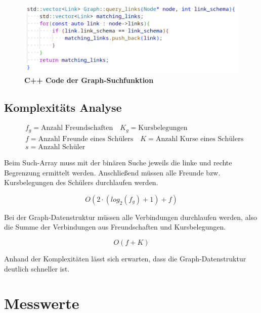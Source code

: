 \documentclass[11pt,a4paper]{article}
\begin{document}
\vspace*{0.5cm}

\begin{figure}[H]
    \centering
    \includegraphics[width=1.0\textwidth]{./res/code_graphdb.png}
    \caption{\textbf{C++ Code der Graph-Suchfunktion}}
\end{figure}

\subsection{Komplexitäts Analyse}

\begin{align*}
    & f_g = \text{Anzahl Freundschaften} \quad
    K_g = \text{Kursbelegungen} \\ 
    & f = \text{Anzahl Freunde eines Schülers} \quad
    K = \text{Anzahl Kurse eines Schülers} \\
    & s = \text{Anzahl Schüler} \quad
\end{align*}

Beim Such-Array muss mit der binären Suche jeweils die linke und rechte Begrenzung
ermittelt werden. Anschließend müssen alle Freunde bzw. Kursbelegungen des
Schülers durchlaufen werden.

\begin{equation*}
    O(2 \cdot ( log_2(f_g) + 1 ) + f)
\end{equation*}

Bei der Graph-Datenstruktur müssen alle Verbindungen durchlaufen werden, also
die Summe der Verbindungen aus Freundschaften und Kursbelegungen.

\begin{equation*}
    O(f + K)
\end{equation*}

Anhand der Komplexitäten lässt sich erwarten, dass die Graph-Datenstruktur deutlich
schneller ist.

\section{Messwerte}
\end{document}
